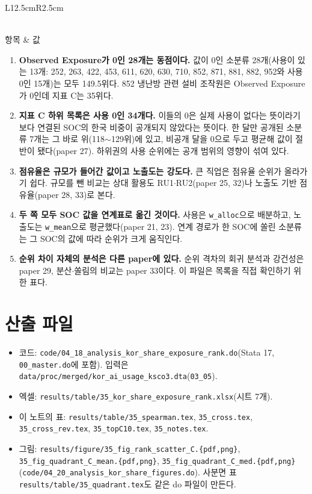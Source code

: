 \documentclass[11pt]{article}
\begin{document}
\begin{longtable}{L{12.5cm}R{2.5cm}}
\caption{점검 수치}\label{tab:notes}\\
\toprule
항목 & 값 \\
\midrule
\endfirsthead

\bottomrule
\end{longtable}

\begin{enumerate}[leftmargin=*]
  \item \textbf{Observed Exposure가 0인 28개는 동점이다.} 값이 0인 소분류 28개(사용이 있는 13개: 252, 263, 422, 453, 611, 620, 630, 710, 852, 871, 881, 882, 952와 사용 0인 15개)는 모두 149.5위다. 852 냉난방 관련 설비 조작원은 Observed Exposure가 0인데 지표 C는 35위다.
  \item \textbf{지표 C 하위 목록은 사용 0인 34개다.} 이들의 0은 실제 사용이 없다는 뜻이라기보다 연결된 SOC의 한국 비중이 공개되지 않았다는 뜻이다. 한 달만 공개된 소분류 7개는 그 바로 위(118$\sim$129위)에 있고, 비공개 달을 0으로 두고 평균해 값이 절반이 됐다(paper 27). 하위권의 사용 순위에는 공개 범위의 영향이 섞여 있다.
  \item \textbf{점유율은 규모가 들어간 값이고 노출도는 강도다.} 큰 직업은 점유율 순위가 올라가기 쉽다. 규모를 뺀 비교는 상대 활용도 RU1$\cdot$RU2(paper 25, 32)나 노출도 기반 점유율(paper 28, 33)로 본다.
  \item \textbf{두 쪽 모두 SOC 값을 연계표로 옮긴 것이다.} 사용은 \texttt{w\_alloc}으로 배분하고, 노출도는 \texttt{w\_mean}으로 평균했다(paper 21, 23). 연계 경로가 한 SOC에 쏠린 소분류는 그 SOC의 값에 따라 순위가 크게 움직인다.
  \item \textbf{순위 차이 자체의 분석은 다른 paper에 있다.} 순위 격차의 회귀 분석과 강건성은 paper 29, 분산$\cdot$쏠림의 비교는 paper 33이다. 이 파일은 목록을 직접 확인하기 위한 표다.
\end{enumerate}

\section{산출 파일}

\begin{itemize}[leftmargin=*]
  \item 코드: \texttt{code/04\_18\_analysis\_kor\_share\_exposure\_rank.do}(Stata 17, \texttt{00\_master.do}에 포함). 입력은 \texttt{data/proc/merged/kor\_ai\_usage\_ksco3.dta}(\texttt{03\_05}).
  \item 엑셀: \texttt{results/table/35\_kor\_share\_exposure\_rank.xlsx}(시트 7개).
  \item 이 노트의 표: \texttt{results/table/35\_spearman.tex}, \texttt{35\_cross.tex}, \texttt{35\_cross\_rev.tex}, \texttt{35\_topC10.tex}, \texttt{35\_notes.tex}.
  \item 그림: \texttt{results/figure/35\_fig\_rank\_scatter\_C.\{pdf,png\}}, \texttt{35\_fig\_quadrant\_C\_mean.\{pdf,png\}}, \texttt{35\_fig\_quadrant\_C\_med.\{pdf,png\}}(\texttt{code/04\_20\_analysis\_kor\_share\_figures.do}). 사분면 표 \texttt{results/table/35\_quadrant.tex}도 같은 do 파일이 만든다.
\end{itemize}

\printbibliography[title={참고문헌}]
\end{document}
